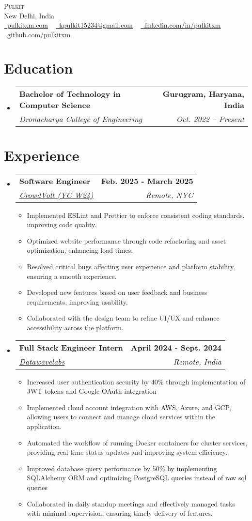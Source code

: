 \documentclass[letterpaper,11pt]{article}
\makeatletter
\newcommand{\resumeItem}[1]{
  \item{
    {#1 \vspace{-2pt}}
  }
}
\newcommand{\resumeSubheading}[4]{
  \vspace{-2pt}\item
    \begin{tabular*}{1.0\textwidth}[t]{l@{\extracolsep{\fill}}r}
      \textbf{#1} & \textbf{ #2} \\
      \textit{#3} & \textit{ #4} \\
    \end{tabular*}\vspace{-7pt}
}
\newcommand{\resumeSubHeadingListStart}{\begin{itemize}[leftmargin=0.0in, label={}]}
\newcommand{\resumeSubHeadingListEnd}{\end{itemize}}
\newcommand{\resumeItemListStart}{\begin{itemize}}
\newcommand{\resumeItemListEnd}{\end{itemize}\vspace{-5pt}}
\makeatother
\begin{document}
\begin{center}
	{\Huge \scshape Pulkit} \\ \vspace{3pt}
	New Delhi, India \\ \vspace{3pt}
	\small
	\href{https://pulkitxm.com/}{\raisebox{-0.2\height}\faLink\ \underline{pulkitxm.com}} ~
	\href{mailto:kpulkit15234@gmail.com}{\raisebox{-0.2\height}\faEnvelope\ \underline{kpulkit15234@gmail.com}} ~
	\href{https://www.linkedin.com/in/pulkitxm}{\raisebox{-0.2\height}\faLinkedin\ \underline{linkedin.com/in/pulkitxm}} ~
	\href{https://github.com/Pulkitxm}{\raisebox{-0.2\height}\faGithub\ \underline{github.com/pulkitxm}}
	\vspace{-8pt}
\end{center}

\section{Education}
\resumeSubHeadingListStart%
\resumeSubheading%
{Bachelor of Technology in Computer Science}{Gurugram, Haryana, India}
{Dronacharya College of Engineering}{Oct. 2022 – Present}
\resumeSubHeadingListEnd%

\section{Experience}
\resumeSubHeadingListStart%
\resumeSubheading%
{Software Engineer}{Feb. 2025 - March 2025}
{\href{https://www.datawavelabs.io/}{CrowdVolt (YC W24)}}{Remote, NYC}
\resumeItemListStart%
\resumeItem{Implemented ESLint and Prettier to enforce consistent coding standards, improving code quality.}
\resumeItem{Optimized website performance through code refactoring and asset optimization, enhancing load times.}
\resumeItem{Resolved critical bugs affecting user experience and platform stability, ensuring a smooth experience.}
\resumeItem{Developed new features based on user feedback and business requirements, improving usability.}
\resumeItem{Collaborated with the design team to refine UI/UX and enhance accessibility across the platform.}
\resumeItemListEnd%
\resumeSubheading%
{Full Stack Engineer Intern}{April 2024 - Sept. 2024}
{\href{https://www.datawavelabs.io/}{Datawavelabs}}{Remote, India}
\resumeItemListStart%
\resumeItem{Increased user authentication security by 40\% through implementation of JWT tokens and Google OAuth integration}
\resumeItem{Implemented cloud account integration with AWS, Azure, and GCP, allowing users to connect and manage cloud services within the application.}
\resumeItem{Automated the workflow of running Docker containers for cluster services, providing real-time status updates and improving system efficiency.}
\resumeItem{Improved database query performance by 50\% by implementing SQLAlchemy ORM and optimizing PostgreSQL queries instead of raw sql queries}
\resumeItem{Collaborated in daily standup meetings and effectively managed tasks with minimal supervision, ensuring timely delivery of features.}
\resumeItemListEnd%
\resumeSubHeadingListEnd%
\vspace{-14pt}
\end{document}
